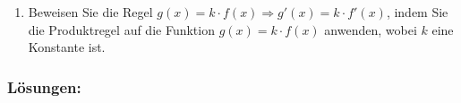 \begin{enumerate}
    \item Beweisen Sie die Regel \( g(x) = k \cdot f(x) \Rightarrow g'(x) = k \cdot f'(x)\), indem Sie die Produktregel auf die Funktion $g(x) = k \cdot f(x)$ anwenden, wobei $k$ eine Konstante ist.






\end{enumerate}
\clearpage
\subsubsection*{Lösungen:}

